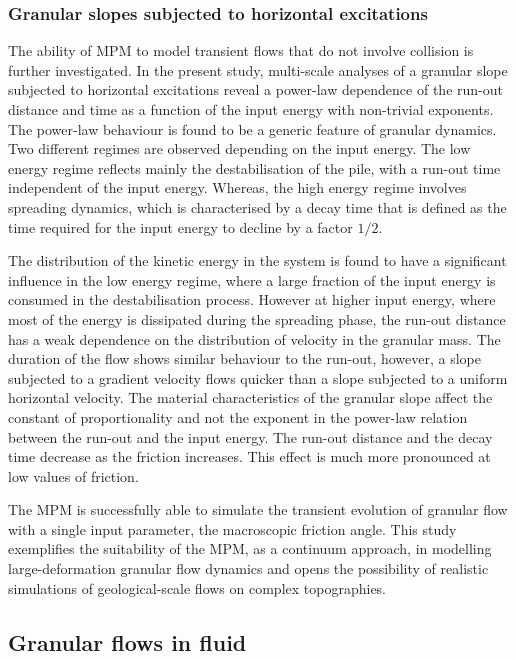 \subsubsection*{Granular slopes subjected to horizontal excitations}

The ability of MPM to model transient flows that do not involve collision 
is further investigated. In the 
present study, multi-scale analyses of a granular slope subjected to 
horizontal excitations reveal a power-law dependence of the run-out distance 
and time as a function of the input energy with non-trivial exponents. The 
power-law behaviour is found to be a generic feature of granular dynamics. Two 
different regimes are observed depending on the input energy. The low energy 
regime reflects mainly the destabilisation of the pile, with a run-out time 
independent of the input energy. Whereas, the high energy regime involves 
spreading dynamics, which is characterised by a decay time that is defined as 
the time required for the input energy to  decline by a factor $1/2$.


The distribution of the kinetic energy in the system is found to have a 
significant influence in the low energy regime, where a large 
fraction of the input energy is consumed in the destabilisation process. 
However at higher input energy, where most of the energy is dissipated during 
the spreading phase, the run-out distance has a weak dependence on 
the distribution of velocity in the granular mass. The duration of the flow 
shows similar behaviour to the run-out, however, a slope subjected to a 
gradient velocity flows quicker than a slope subjected to a uniform
horizontal velocity. The material characteristics of the granular slope affect 
the 
constant of proportionality and not the exponent in the power-law relation 
between the run-out and the input energy. The run-out distance and the decay 
time decrease as the friction increases. This effect is much more pronounced at 
low values of friction. 

The MPM is successfully able to simulate the transient evolution of granular 
flow with a single input parameter, the macroscopic friction angle. This study 
exemplifies the suitability of the MPM, as a continuum approach, in modelling 
large-deformation granular flow dynamics and opens the possibility of realistic 
simulations of geological-scale flows on complex topographies.

\subsection{Granular flows in fluid}

